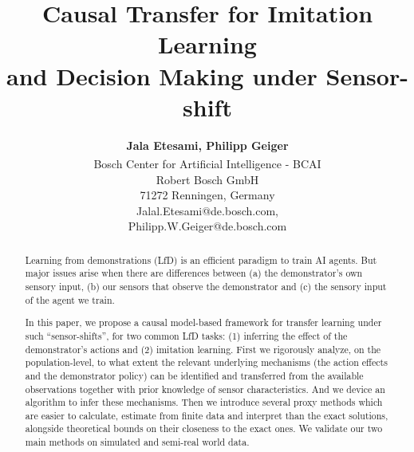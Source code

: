\documentclass[letterpaper]{article} %
\title{Causal Transfer for Imitation Learning \\ and Decision Making under Sensor-shift}
\author{\Large \textbf{Jala Etesami, Philipp Geiger }\\ %
\textsuperscript{\rm }Bosch Center for Artificial Intelligence - BCAI \\ %
Robert Bosch GmbH\\
71272 Renningen, Germany\\
Jalal.Etesami@de.bosch.com,\\
Philipp.W.Geiger@de.bosch.com %
}
\theoremstyle{definition}%
\theoremstyle{definition}
\newcommand{\todo}[1]{\textcolor{red}{#1}}
\begin{document}
\maketitle

\begin{abstract}
Learning from demonstrations (LfD) is an efficient paradigm to train AI agents.
But major issues arise when there are differences between (a)  the demonstrator's own sensory input, (b) our sensors that observe the demonstrator and (c) the sensory input of the agent we train.

In this paper, we propose a causal model-based framework for transfer learning under such ``sensor-shifts'', for two common LfD tasks:
(1) inferring the effect of the demonstrator's actions and (2) imitation learning.
%
First we rigorously analyze, on the population-level, to what extent the relevant underlying mechanisms (the action effects and the demonstrator policy) can be identified and transferred from the available observations together with prior knowledge of sensor characteristics. And we device an algorithm to infer these mechanisms.
Then we introduce several proxy methods which are easier to calculate, estimate from finite data and interpret than the exact solutions, alongside theoretical bounds on their closeness to the exact ones.
We validate our two main methods on simulated and semi-real world data.
\end{abstract}
\end{document}
